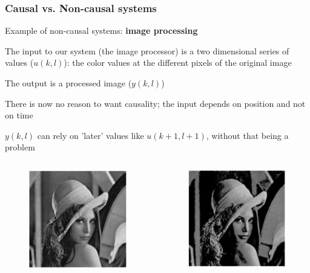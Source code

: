 \begin{frame}
	\frametitle{Causal vs. Non-causal systems}
	Example of non-causal systems: \textbf{image processing}\\
	\begin{itemize}
		\small{
			\item The input to our system (the image processor) is a two dimensional series of values ($u(k,l)$): the color values at the different pixels of the original image
			\item The output is a processed image ($y(k,l)$)
			\item There is now no reason to want causality; the input depends on position and not on time
			\item $y(k,l)$ can rely on 'later' values like $u(k+1,l+1)$, without that being a problem}
	\end{itemize}
	\vspace{-2ex}
	\begin{columns}
		\begin{figure}
			\includegraphics[width=.5\linewidth]{original}
		\end{figure}
		\vspace{-4ex}
		
		\begin{figure}
			\includegraphics[width=.5\linewidth]{removed}
		\end{figure}
		\vspace{-4ex}
		

\end{columns}
\end{frame}

